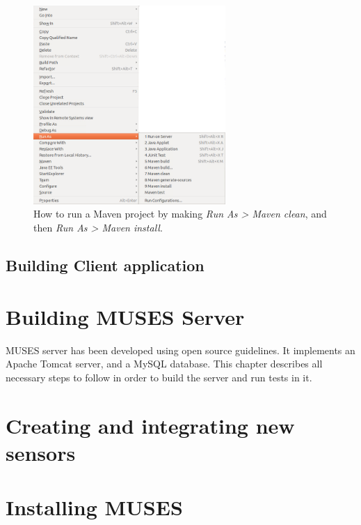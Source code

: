 \documentclass[a4paper,11pt]{book}
\begin{document}
\begin{figure}
  \begin{center}
    \includegraphics[width=0.65\textwidth]{./Figures/runAs.png}
    \caption{How to run a Maven project by making \textit{Run As > Maven clean}, and then \textit{Run As > Maven install}.}
    \label{fig:RunAs}
  \end{center}
\end{figure}

\section{Building Client application}
\label{sec:buildclient}



\chapter{Building MUSES Server}
\label{ch:server}

MUSES server has been developed using open source guidelines. It implements an Apache Tomcat server, and a MySQL database. This chapter describes all necessary steps to follow in order to build the server and run tests in it.



\chapter{Creating and integrating new sensors}
\label{ch:sensors}


\chapter{Installing MUSES}
\label{ch:installmuses}



\end{document}
